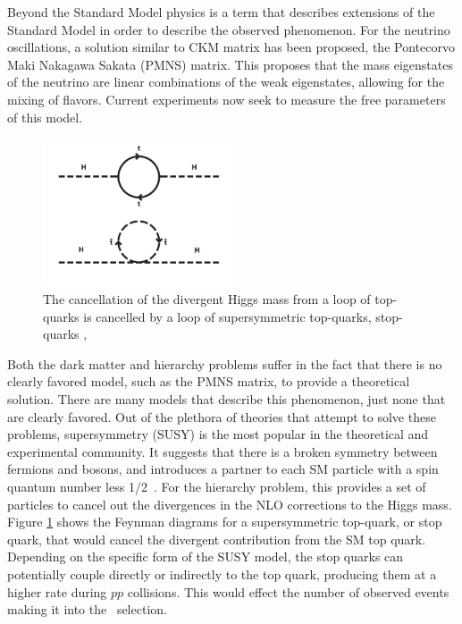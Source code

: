 \par Beyond the Standard Model physics is a term that describes
extensions of the Standard Model in order to describe the observed
phenomenon.  For the neutrino oscillations, a solution similar to CKM
matrix has been proposed, the Pontecorvo Maki Nakagawa Sakata (PMNS)
matrix.  This proposes that the mass eigenstates of the neutrino are
linear combinations of the weak eigenstates, allowing for the mixing
of flavors.  Current experiments now seek to measure the free
parameters of this model.  

\begin{figure}[h]
   \centering
  \includegraphics[width=0.5\textwidth]{Figures/Basic_Diagrams/hierarchy_problem_susy_solution.png}
  \caption{The cancellation of the divergent Higgs mass from a loop of
  top-quarks is cancelled by a loop of supersymmetric top-quarks,
  stop-quarks \cite{ex:Hierarchy_image},} \label{fig:hierarchy_problem}
\end{figure}

\par Both the dark matter and hierarchy problems suffer in the fact
that there is no clearly favored model, such as the PMNS matrix, to provide a
theoretical solution.  There are many models that describe this
phenomenon, just none that are clearly favored.  Out of the plethora of theories that attempt to
solve these problems, supersymmetry (SUSY) is the most popular in the
theoretical and experimental community.  It suggests that there is a
broken symmetry between fermions and bosons, and introduces a partner
to each SM particle with a spin quantum number less
1/2~\cite{Martin_SUSY_primer}.  For the hierarchy problem, this
provides a set of particles to cancel out the divergences in the NLO
corrections to the Higgs mass.  Figure \ref{fig:hierarchy_problem}
shows the Feynman diagrams for a supersymmetric top-quark, or stop
quark, that would cancel the divergent contribution from the SM top
quark.  Depending on the specific form of the SUSY model, the stop
quarks can potentially couple directly or indirectly to the top quark,
producing them at a higher rate during $pp$ collisions. This would
effect the number of observed events making it into the 
\ttH~selection.  

